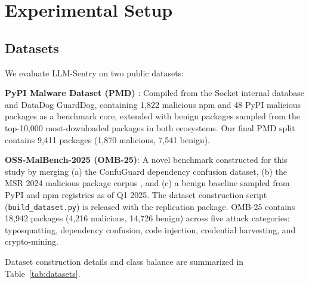 \documentclass[conference]{IEEEtran}
\begin{document}
\section{Experimental Setup}
\label{sec:setup}

\subsection{Datasets}

We evaluate LLM-Sentry on two public datasets:

\textbf{PyPI Malware Dataset (PMD)} \cite{guarddog2023msr}: Compiled from the Socket internal database and DataDog GuardDog, containing 1,822 malicious npm and 48 PyPI malicious packages as a benchmark core, extended with benign packages sampled from the top-10,000 most-downloaded packages in both ecosystems. Our final PMD split contains 9,411 packages (1,870 malicious, 7,541 benign).

\textbf{OSS-MalBench-2025 (OMB-25)}: A novel benchmark constructed for this study by merging (a) the ConfuGuard \cite{confuguard2024} dependency confusion dataset, (b) the MSR 2024 malicious package corpus \cite{guarddog2023msr}, and (c) a benign baseline sampled from PyPI and npm registries as of Q1 2025. The dataset construction script (\texttt{build\_dataset.py}) is released with the replication package. OMB-25 contains 18,942 packages (4,216 malicious, 14,726 benign) across five attack categories: typosquatting, dependency confusion, code injection, credential harvesting, and crypto-mining.

Dataset construction details and class balance are summarized in Table~\ref{tab:datasets}.

\begin{table}[htbp]
\caption{Dataset Summary}
\label{tab:datasets}
\centering
\small
{}
\end{table}
\end{document}
